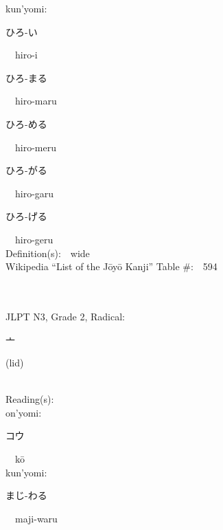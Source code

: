 \begin{multicols}{2}
{\hspace*{1em}}kun'yomi:\ \ \\
{\hspace*{2em}}{\begin{CJK}{UTF8}{min} ひろ-い \end{CJK}}\ \ hiro-i\ \ \\
{\hspace*{2em}}{\begin{CJK}{UTF8}{min} ひろ-まる \end{CJK}}\ \ hiro-maru\ \ \\
{\hspace*{2em}}{\begin{CJK}{UTF8}{min} ひろ-める \end{CJK}}\ \ hiro-meru\ \ \\
{\hspace*{2em}}{\begin{CJK}{UTF8}{min} ひろ-がる \end{CJK}}\ \ hiro-garu\ \ \\
{\hspace*{2em}}{\begin{CJK}{UTF8}{min} ひろ-げる \end{CJK}}\ \ hiro-geru\ \ \\
Definition(s):\ \ wide \\
Wikipedia ``List of the J\=oy\=o Kanji'' Table \#:\ \ 594 \\
\ \ \\
{\fontsize{34pt}{40pt}  }\ \ \\  %
{JLPT N3, Grade 2, Radical:\ \ {\begin{CJK}{UTF8}{min} 亠 \end{CJK}} (lid) } \\
Reading(s):\ \ \\
{\hspace*{1em}}on'yomi:\ \ \\
{\hspace*{2em}}{\begin{CJK}{UTF8}{min} コウ \end{CJK}}\ \ k\=o\ \ \\
{\hspace*{1em}}kun'yomi:\ \ \\
{\hspace*{2em}}{\begin{CJK}{UTF8}{min} まじ-わる \end{CJK}}\ \ maji-waru\ \ \\

\end{multicols}
